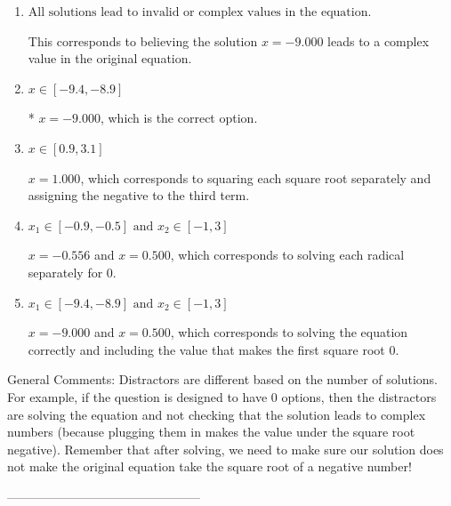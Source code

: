 \documentclass{extbook}[14pt]
\begin{document}
\begin{enumerate}[label=\Alph*.] 
\item $ \text{All solutions lead to invalid or complex values in the equation.} $ 

 This corresponds to believing the solution $x = -9.000$ leads to a complex value in the original equation. 
\item $ x \in [-9.4,-8.9] $ 

 * $x = -9.000$, which is the correct option. 
\item $ x \in [0.9,3.1] $ 

 $x = 1.000$, which corresponds to squaring each square root separately and assigning the negative to the third term. 
\item $ x_1 \in [-0.9, -0.5] \text{ and } x_2 \in [-1,3] $ 

 $x = -0.556$ and $x = 0.500$, which corresponds to solving each radical separately for 0. 
\item $ x_1 \in [-9.4, -8.9] \text{ and } x_2 \in [-1,3] $ 

 $x = -9.000$ and $x = 0.500$, which corresponds to solving the equation correctly and including the value that makes the first square root 0. 
\end{enumerate} 
 
General Comments: Distractors are different based on the number of solutions. For example, if the question is designed to have 0 options, then the distractors are solving the equation and not checking that the solution leads to complex numbers (because plugging them in makes the value under the square root negative). Remember that after solving, we need to make sure our solution does not make the original equation take the square root of a negative number!

-----------------------------------------------
\end{document}

